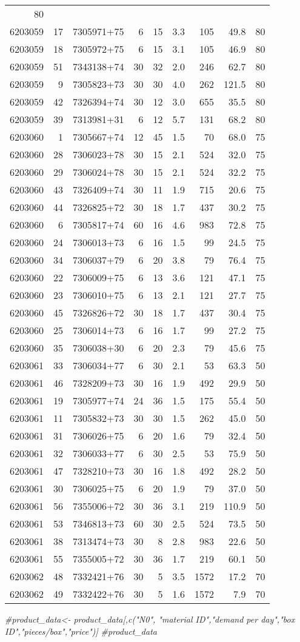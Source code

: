 \documentclass[
]{article}
\newenvironment{Shaded}{\begin{snugshade}}{\end{snugshade}}
\newcommand{\CommentTok}[1]{\textcolor[rgb]{0.56,0.35,0.01}{\textit{#1}}}
\begin{document}
\begin{longtable}[]{@{}rrlrrrrrr@{}}
80\tabularnewline
6203059 & 17 & 7305971+75 & 6 & 15 & 3.3 & 105 & 49.8 &
80\tabularnewline
6203059 & 18 & 7305972+75 & 6 & 15 & 3.1 & 105 & 46.9 &
80\tabularnewline
6203059 & 51 & 7343138+74 & 30 & 32 & 2.0 & 246 & 62.7 &
80\tabularnewline
6203059 & 9 & 7305823+73 & 30 & 30 & 4.0 & 262 & 121.5 &
80\tabularnewline
6203059 & 42 & 7326394+74 & 30 & 12 & 3.0 & 655 & 35.5 &
80\tabularnewline
6203059 & 39 & 7313981+31 & 6 & 12 & 5.7 & 131 & 68.2 &
80\tabularnewline
6203060 & 1 & 7305667+74 & 12 & 45 & 1.5 & 70 & 68.0 & 75\tabularnewline
6203060 & 28 & 7306023+78 & 30 & 15 & 2.1 & 524 & 32.0 &
75\tabularnewline
6203060 & 29 & 7306024+78 & 30 & 15 & 2.1 & 524 & 32.2 &
75\tabularnewline
6203060 & 43 & 7326409+74 & 30 & 11 & 1.9 & 715 & 20.6 &
75\tabularnewline
6203060 & 44 & 7326825+72 & 30 & 18 & 1.7 & 437 & 30.2 &
75\tabularnewline
6203060 & 6 & 7305817+74 & 60 & 16 & 4.6 & 983 & 72.8 &
75\tabularnewline
6203060 & 24 & 7306013+73 & 6 & 16 & 1.5 & 99 & 24.5 & 75\tabularnewline
6203060 & 34 & 7306037+79 & 6 & 20 & 3.8 & 79 & 76.4 & 75\tabularnewline
6203060 & 22 & 7306009+75 & 6 & 13 & 3.6 & 121 & 47.1 &
75\tabularnewline
6203060 & 23 & 7306010+75 & 6 & 13 & 2.1 & 121 & 27.7 &
75\tabularnewline
6203060 & 45 & 7326826+72 & 30 & 18 & 1.7 & 437 & 30.4 &
75\tabularnewline
6203060 & 25 & 7306014+73 & 6 & 16 & 1.7 & 99 & 27.2 & 75\tabularnewline
6203060 & 35 & 7306038+30 & 6 & 20 & 2.3 & 79 & 45.6 & 75\tabularnewline
6203061 & 33 & 7306034+77 & 6 & 30 & 2.1 & 53 & 63.3 & 50\tabularnewline
6203061 & 46 & 7328209+73 & 30 & 16 & 1.9 & 492 & 29.9 &
50\tabularnewline
6203061 & 19 & 7305977+74 & 24 & 36 & 1.5 & 175 & 55.4 &
50\tabularnewline
6203061 & 11 & 7305832+73 & 30 & 30 & 1.5 & 262 & 45.0 &
50\tabularnewline
6203061 & 31 & 7306026+75 & 6 & 20 & 1.6 & 79 & 32.4 & 50\tabularnewline
6203061 & 32 & 7306033+77 & 6 & 30 & 2.5 & 53 & 75.9 & 50\tabularnewline
6203061 & 47 & 7328210+73 & 30 & 16 & 1.8 & 492 & 28.2 &
50\tabularnewline
6203061 & 30 & 7306025+75 & 6 & 20 & 1.9 & 79 & 37.0 & 50\tabularnewline
6203061 & 56 & 7355006+72 & 30 & 36 & 3.1 & 219 & 110.9 &
50\tabularnewline
6203061 & 53 & 7346813+73 & 60 & 30 & 2.5 & 524 & 73.5 &
50\tabularnewline
6203061 & 38 & 7313474+73 & 30 & 8 & 2.8 & 983 & 22.6 &
50\tabularnewline
6203061 & 55 & 7355005+72 & 30 & 36 & 1.7 & 219 & 60.1 &
50\tabularnewline
6203062 & 48 & 7332421+76 & 30 & 5 & 3.5 & 1572 & 17.2 &
70\tabularnewline
6203062 & 49 & 7332422+76 & 30 & 5 & 1.6 & 1572 & 7.9 &
70\tabularnewline
\bottomrule
\end{longtable}

\begin{Shaded}
\begin{Highlighting}[]
\CommentTok{#product_data<- product_data[,c("N0", "material ID","demand per day","box ID","pieces/box","price")]}
\CommentTok{#product_data}
\end{Highlighting}
\end{Shaded}
\end{document}
